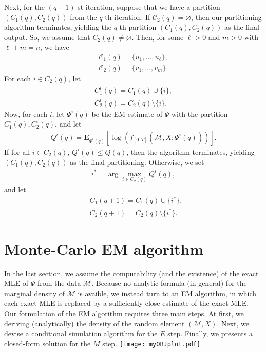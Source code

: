 \documentclass[12pt]{article}%
\begin{document}
Next, for the $(q+1)$-st iteration, suppose that we have a partition $(C_1(q), C_2(q))$ from the $q$-th iteration. If $\mathcal C_2(q) = \varnothing$, then our partitioning algorithm terminates, yielding the $q$-th partition $(C_1(q), C_2(q))$ as the final output.  So, we assume that $C_2(q)\neq \varnothing$.  Then, for some $\ell > 0$ and $m > 0$ with $\ell + m = n$, we have 
\begin{eqnarray}
\mathcal C_1(q) = \{u_1,\ldots, u_\ell\},\\
\mathcal C_2(q) = \{v_1,\ldots, v_m\}.
\end{eqnarray} 
For each $i \in C_2(q)$, let 
\begin{eqnarray}
C_1^{i}(q) = C_1(q) \cup \{i\}, \\
C_2^{i}(q) = C_2(q) \setminus \{i\}.
\end{eqnarray}
Now, for each $i$, let $\Psi^{i}(q)$ be the EM estimate of $\Psi$ with the partition $C_1^{i}(q), C_2^{i}(q)$, and let 
\begin{eqnarray}
Q^{i}(q) = \mathbf E_{\Psi^{i}(q)}\left[\log(f_{[0,T]}(\mathcal M,X;\Psi^{i}(q)))\right].
\end{eqnarray}
If for all $i \in C_2(q)$, $Q^{i}(q) \le Q(q)$, then the algorithm terminates, yielding 
$(C_1(q), C_2(q))$ as the final partitioning.  Otherwise, we set 
\begin{eqnarray}
i^* = \arg\max_{i \in C_2(q)} Q^{i}(q),
\end{eqnarray}
and let 
\begin{eqnarray}
&C_1(q+1) = C_1(q) \cup \{i^*\},\\
&C_2(q+1) = C_2(q) \setminus \{i^*\}.
\end{eqnarray}

\section{Monte-Carlo EM algorithm}
In the last section, we assume the computability (and the existence) 
of the exact MLE of $\Psi$ from the data $\mathcal M$.   
Because no analytic formula (in general) for the marginal density 
of $\mathcal M$ is avaible,
we instead turn to an EM algorithm, in which each exact MLE is replaced 
by a sufficiently close estimate of the exact MLE.
Our formulation of the EM algorithm requires 
three main steps.  
At first, we deriving (analytically) 
the density of the random element $(\mathcal M, X)$.  
Next, we devise a conditional simulation algorithm for the $E$ step.  
Finally, we presents a closed-form solution for the $M$ step.
\texttt{[image: myOBJplot.pdf]}
\end{document}
